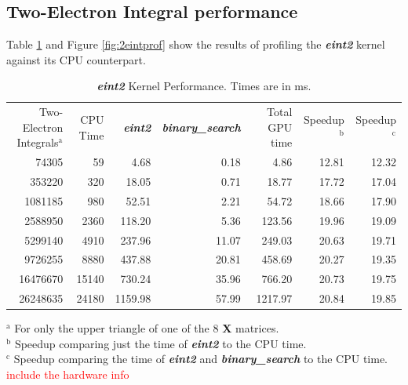 \documentclass[12pt]{report}
\newcommand{\notetodylan}[1]{\textcolor{red}{#1}} %
\newcommand{\kernel}[1]{\textit{\textbf{#1}}}
\begin{document}
\subsection{Two-Electron Integral performance}
Table \ref{tab:2eintprof} and Figure \ref{fig:2eintprof} show the results of profiling the \kernel{eint2} kernel against its CPU counterpart.

\begin{table}[h!]
\caption[\kernel{eint2} Kernel Performance]{\kernel{eint2} Kernel Performance. Times are in ms.}
\label{tab:2eintprof}
\begin{tabular}{rrrrrrr}
	\multirow{3}{2cm}{Two-Electron Integrals$^{\textrm{a}}$}	&	\multirow{3}{*}{CPU Time}		&	\multirow{3}{*}{\kernel{eint2}}	&	\multirow{3}{2.4cm}{\kernel{binary\_search}}		&	\multirow{3}{1cm}{Total GPU time}	&	\multirow{3}{*}{Speedup$^{\textrm{b}}$}	&	\multirow{3}{*}{Speedup$^{\textrm{c}}$}	\\
	\\
	\\
	\hline
	74305	&	59		&	4.68		&	0.18		&	4.86		&	12.81	&	12.32	\\
	353220	&	320		&	18.05	&	0.71		&	18.77	&	17.72	&	17.04	\\
	1081185	&	980		&	52.51	&	2.21		&	54.72	&	18.66	&	17.90	\\
	2588950	&	2360		&	118.20	&	5.36		&	123.56	&	19.96	&	19.09	\\
	5299140	&	4910		&	237.96	&	11.07	&	249.03	&	20.63	&	19.71	\\
	9726255	&	8880		&	437.88	&	20.81	&	458.69	&	20.27	&	19.35	\\
	16476670	&	15140	&	730.24	&	35.96	&	766.20	&	20.73	&	19.75	\\
	26248635	&	24180	&	1159.98	&	57.99	&	1217.97	&	20.84	&	19.85	\\
\end{tabular}
$^{\textrm{a}}$ For only the upper triangle of one of the 8 \textbf{X} matrices. \\
$^{\textrm{b}}$ Speedup comparing just the time of \kernel{eint2} to the CPU time. \\
$^{\textrm{c}}$ Speedup comparing the time of \kernel{eint2} and \kernel{binary\_search} to the CPU time. \\
\notetodylan{include the hardware info}
\end{table}
\end{document}
